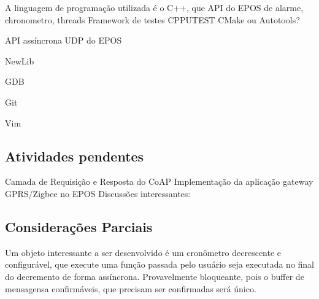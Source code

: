 A linguagem de programa\c{c}\~ao utilizada \'e o C++, que API do EPOS de alarme, chronometro, threads
Framework de testes CPPUTEST CMake ou Autotools?

API ass\'incrona UDP do EPOS

NewLib

GDB

Git

Vim

\subsection{Atividades pendentes}
Camada de Requisi\c{c}\~ao e Resposta do CoAP
Implementa\c{c}\~ao da aplica\c{c}\~ao gateway GPRS/Zigbee no EPOS
Discuss\~oes interessantes:


\subsection{Considera\c{c}\~oes Parciais}
Um objeto interessante a ser desenvolvido \'e um cronômetro decrescente e configur\'avel, que execute uma fun\c{c}\~ao passada pelo usu\'ario seja executada no final do decremento de forma ass\'incrona. Provavelmente bloqueante, pois o buffer de mensagensa confirm\'aveis, que precisam ser confirmadas ser\'a \'unico.
